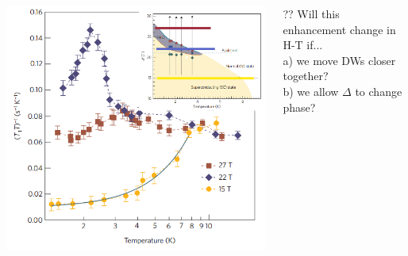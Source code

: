 \documentclass[amssymb,amsmath]{beamer}
\begin{document}
\begin{frame}
\begin{columns}
\begin{column}{0.5\textwidth}
\end{column}
\end{columns}
\begin{columns}
\begin{column}{0.4\textwidth}
\includegraphics[scale=0.2]{./figures/organic_T1.png}
\end{column}
\begin{column}{0.7\textwidth}
?? Will this enhancement change in H-T if...\\
\quad a) we move DWs closer together? \\
\quad b) we allow $\Delta$ to change phase?
\end{column}
\end{columns}
\end{frame}
\end{document}
